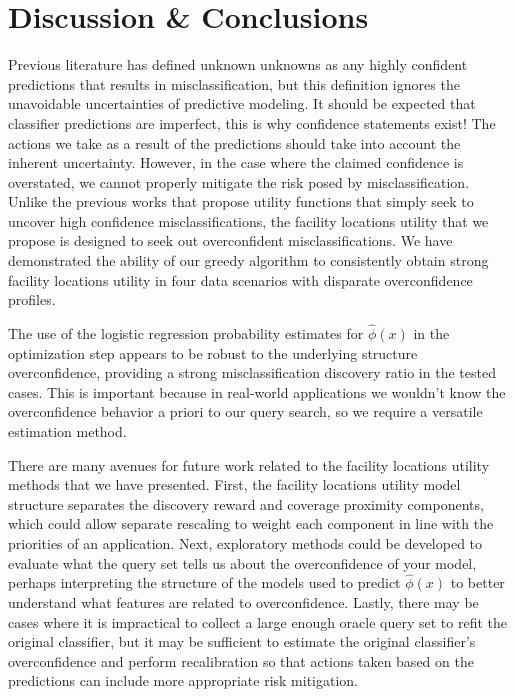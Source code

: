 \documentclass[letterpaper]{article} %
\begin{document}
\section{Discussion \& Conclusions}

Previous literature has defined unknown unknowns as any highly confident predictions that results in misclassification, but this definition ignores the unavoidable uncertainties of predictive modeling. It should be expected that classifier predictions are imperfect, this is why confidence statements exist! The actions we take as a result of the predictions should take into account the inherent uncertainty. However, in the case where the claimed confidence is overstated, we cannot properly mitigate the risk posed by misclassification. Unlike the previous works that propose utility functions that simply seek to uncover high confidence misclassifications, the facility locations utility that we propose is designed to seek out overconfident misclassifications. We have demonstrated the ability of our greedy algorithm to consistently obtain strong facility locations utility in four data scenarios with disparate overconfidence profiles. 

The use of the logistic regression probability estimates for $\hat{\phi}(x)$ in the optimization step appears to be robust to the underlying structure overconfidence, providing a strong misclassification discovery ratio in the tested cases. This is important because in real-world applications we wouldn’t know the overconfidence behavior a priori to our query search, so we require a versatile estimation method. 

There are many avenues for future work related to the facility locations utility methods that we have presented. First, the facility locations utility model structure separates the discovery reward and coverage proximity components, which could allow separate rescaling to weight each component in line with the priorities of an application. Next, exploratory methods could be developed to evaluate what the query set tells us about the overconfidence of your model, perhaps interpreting the structure of the models used to predict $\hat{\phi}(x)$ to better understand what features are related to overconfidence. Lastly, there may be cases where it is impractical to collect a large enough oracle query set to refit the original classifier, but it may be sufficient to estimate the original classifier’s overconfidence and perform recalibration so that actions taken based on the predictions can include more appropriate risk mitigation. 
\end{document}
